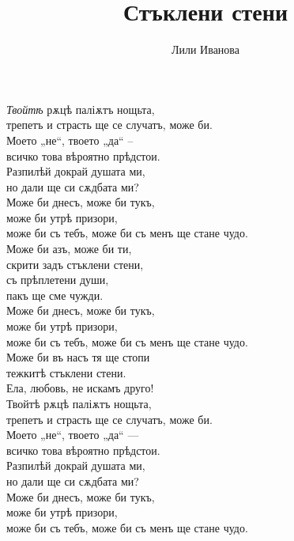 \documentclass{article}
\title{Стъклени стени}
\author{Лили Иванова}
\begin{document}
\maketitle

 \textit{Твойтѣ} рѫцѣ паліѫтъ нощьта,\\
 трепетъ и страсть ще се случатъ, може би. \\
 Моето „не“, твоето „да“ -- \\
 всичко това вѣроятно прѣдстои. \\
 
 Разпилѣй докрай душата ми, \\
 но дали ще си сѫдбата ми? \\
 
 Може би днесъ, може би тукъ, \\
 може би утрѣ призори, \\
 може би съ тебъ, може би съ менъ 
 ще стане чудо. \\
 
 Може би азъ, може би ти, \\
 скрити задъ стъклени стени, \\
 съ прѣплетени души, \\
 пакъ ще сме чужди. \\
 
 Може би днесъ, може би тукъ, \\
 може би утрѣ призори, \\
 може би съ тебъ, може би съ менъ 
 ще стане чудо. \\
 
 Може би въ насъ тя ще стопи \\
 тежкитѣ стъклени стени. \\
 Ела, любовь, 
 не искамъ друго! \\
 
 Твойтѣ рѫцѣ паліѫтъ нощьта, \\
 трепетъ и страсть ще се случатъ, може би. \\
 Моето „не“, твоето „да“ --- \\
 всичко това вѣроятно прѣдстои. \\
 
 Разпилѣй докрай душата ми, \\
 но дали ще си сѫдбата ми? \\
 
 Може би днесъ, може би тукъ, \\
 може би утрѣ призори, \\
 може би съ тебъ, може би съ менъ 
 ще стане чудо. \\
 
\end{document}
